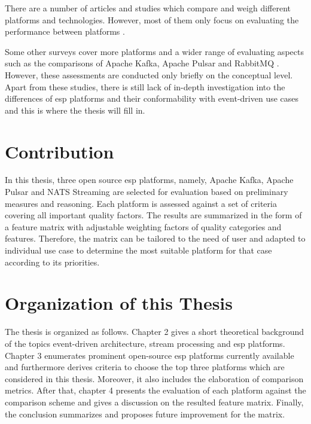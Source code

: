 There are a number of articles and studies which compare and weigh different platforms and technologies. However, most of them only focus on evaluating the performance between platforms \cite{intorruk2019comparative} \cite{benchmarkkafkapulsar}.

Some other surveys cover more platforms and a wider range of evaluating aspects such as the comparisons of Apache Kafka, Apache Pulsar and RabbitMQ \cite{overallcomparekafka} \cite{benchmarkkafkapulsarrabbitmq}. However, these assessments are conducted only briefly on the conceptual level. Apart from these studies, there is still lack of in-depth investigation into the differences of \acrshort{esp} platforms and their conformability with event-driven use cases and this is where the thesis will fill in.
 
\section{Contribution}
In this thesis, three open source \acrshort{esp} platforms, namely, Apache Kafka, Apache Pulsar and NATS Streaming are selected for evaluation based on preliminary measures and reasoning. Each platform is assessed against a set of criteria covering all important quality factors. The results are summarized in the form of a feature matrix with adjustable weighting factors of quality categories and features. Therefore, the matrix can be tailored to the need of user and adapted to individual use case to determine the most suitable platform for that case according to its priorities.


\section{Organization of this Thesis}
The thesis is organized as follows. Chapter 2 gives a short theoretical background of the topics event-driven architecture, stream processing and \acrshort{esp} platforms. Chapter 3 enumerates prominent open-source \acrshort{esp} platforms currently available and furthermore derives criteria to choose the top three platforms which are considered in this thesis. Moreover, it also includes the elaboration of comparison metrics. After that, chapter 4 presents the evaluation of each platform against the comparison scheme and gives a discussion on the resulted feature matrix. Finally, the conclusion summarizes and proposes future improvement for the matrix.

